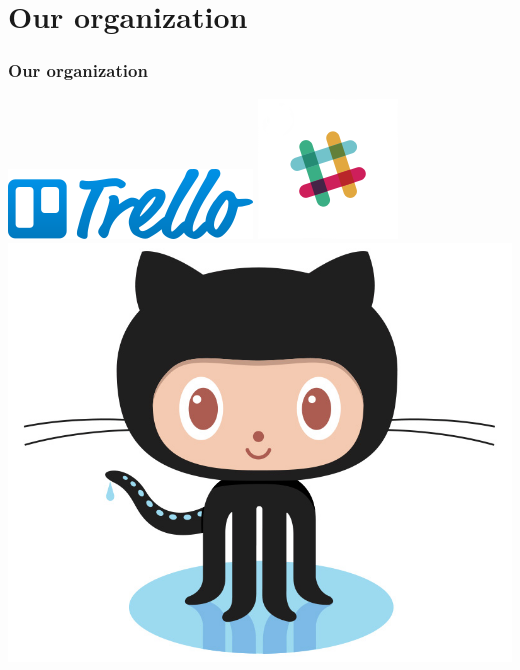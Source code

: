\section[Our organization]{Our organization}
\begin{frame}
	\frametitle{Our organization}
	\begin{center}
	\includegraphics[scale=0.4]{figs/trello.png}
	\includegraphics[scale=0.4]{figs/slack.png}
	\includegraphics[scale=0.1]{figs/Octocat.jpg}
	\end{center}
\end{frame}